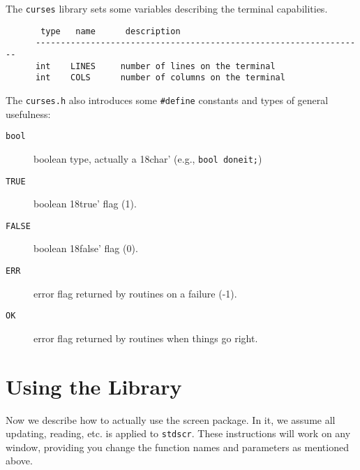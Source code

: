 \label{f0:variables}The \texttt{curses} library sets some variables describing the terminal
capabilities.
\begin{verbatim}       type   name      description
      ------------------------------------------------------------------
      int    LINES     number of lines on the terminal
      int    COLS      number of columns on the terminal
\end{verbatim}
The \texttt{curses.h} also introduces some \texttt{\#define} constants and types
of general usefulness:
\begin{description}
\item[ \texttt{bool}]  boolean type, actually a \char18char' (e.g., \texttt{bool doneit;})
\item[ \texttt{TRUE}]  boolean \char18true' flag (1).
\item[ \texttt{FALSE}]  boolean \char18false' flag (0).
\item[ \texttt{ERR}]  error flag returned by routines on a failure (-1).
\item[ \texttt{OK}]  error flag returned by routines when things go right.
\end{description}

\section{Using the Library}

\label{f0:using}Now we describe how to actually use the screen package.  In it, we assume all
updating, reading, etc. is applied to \texttt{stdscr}.  These instructions will
work on any window, providing you change the function names and parameters as
mentioned above. 

